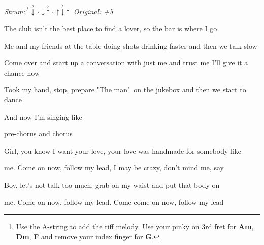\begin{song}


 \quad
\textit{Strum:\footnote{
Use the A-string to add the riff melody. Use your pinky on 3rd fret for
\textbf{Am}, \textbf{Dm}, \textbf{F} and remove your index finger for \textbf{G}.
}} $\AccentDown\Miss\Down\AccentUp\Miss\Up\AccentDown\Up$ \quad
\textit{Original: +5} \par

\large


\normalsize

\bigskip

The club isn't the best place to find a lover, so the bar is where I go \par
{}Me and my friends at the table doing shots drinking faster and then we talk slow \par
Come over and start up a conversation with just me and trust me I'll give it a chance now \par
Took my hand, stop, prepare "The man"\ on the jukebox and then we start to dance \par
And now I'm singing like \par

\bigskip

\begin{chorusbox}{pre-chorus and chorus} \par
{}Girl, you know I want your love, your love was handmade for somebody like \par
{}me. Come on now, follow my lead, I may be crazy, don't mind me, say \par
{}Boy, let's not talk too much, grab on my waist and put that body on \par
{}me. Come on now, follow my lead. Come-come on now, follow my lead \par

\bigskip


\end{chorusbox}
\end{song}
